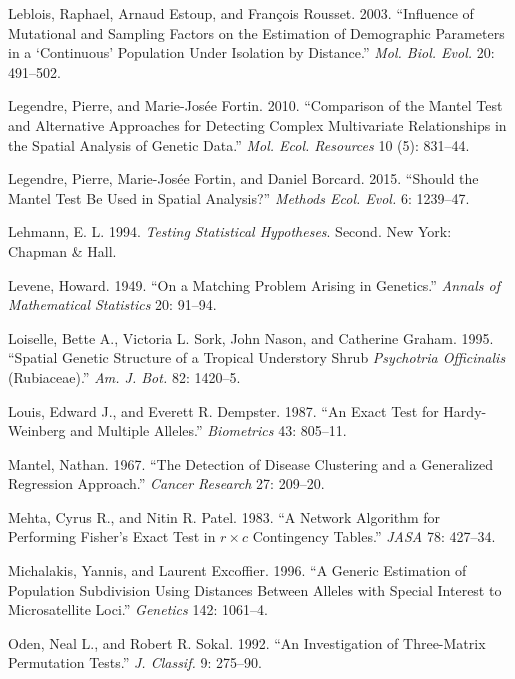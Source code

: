 \documentclass[12pt,]{book}
\begin{document}
\hypertarget{ref-LebloisER03}{}
Leblois, Raphael, Arnaud Estoup, and François Rousset. 2003. ``Influence
of Mutational and Sampling Factors on the Estimation of Demographic
Parameters in a `Continuous' Population Under Isolation by Distance.''
\emph{Mol. Biol. Evol.} 20: 491--502.

\hypertarget{ref-LegendreF10}{}
Legendre, Pierre, and Marie-Josée Fortin. 2010. ``Comparison of the
Mantel Test and Alternative Approaches for Detecting Complex
Multivariate Relationships in the Spatial Analysis of Genetic Data.''
\emph{Mol. Ecol. Resources} 10 (5): 831--44.

\hypertarget{ref-LegendreFB15}{}
Legendre, Pierre, Marie-Josée Fortin, and Daniel Borcard. 2015. ``Should
the Mantel Test Be Used in Spatial Analysis?'' \emph{Methods Ecol.
Evol.} 6: 1239--47.

\hypertarget{ref-Lehmann94test}{}
Lehmann, E. L. 1994. \emph{Testing Statistical Hypotheses}. Second. New
York: Chapman \& Hall.

\hypertarget{ref-Levene49}{}
Levene, Howard. 1949. ``On a Matching Problem Arising in Genetics.''
\emph{Annals of Mathematical Statistics} 20: 91--94.

\hypertarget{ref-LoiselleSNG95}{}
Loiselle, Bette A., Victoria L. Sork, John Nason, and Catherine Graham.
1995. ``Spatial Genetic Structure of a Tropical Understory Shrub
\emph{Psychotria Officinalis} (Rubiaceae).'' \emph{Am. J. Bot.} 82:
1420--5.

\hypertarget{ref-LouisD87}{}
Louis, Edward J., and Everett R. Dempster. 1987. ``An Exact Test for
Hardy-Weinberg and Multiple Alleles.'' \emph{Biometrics} 43: 805--11.

\hypertarget{ref-Mantel67}{}
Mantel, Nathan. 1967. ``The Detection of Disease Clustering and a
Generalized Regression Approach.'' \emph{Cancer Research} 27: 209--20.

\hypertarget{ref-MehtaP83}{}
Mehta, Cyrus R., and Nitin R. Patel. 1983. ``A Network Algorithm for
Performing Fisher's Exact Test in \(r \times
	c\) Contingency Tables.'' \emph{JASA} 78: 427--34.

\hypertarget{ref-MichalakisE96}{}
Michalakis, Yannis, and Laurent Excoffier. 1996. ``A Generic Estimation
of Population Subdivision Using Distances Between Alleles with Special
Interest to Microsatellite Loci.'' \emph{Genetics} 142: 1061--4.

\hypertarget{ref-OdenS92}{}
Oden, Neal L., and Robert R. Sokal. 1992. ``An Investigation of
Three-Matrix Permutation Tests.'' \emph{J. Classif.} 9: 275--90.
\end{document}
